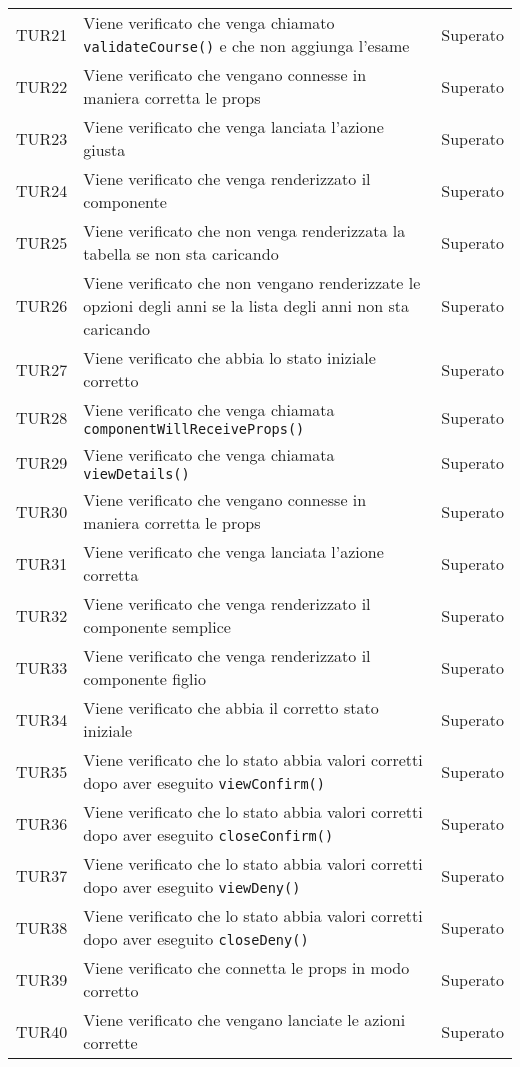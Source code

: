 \documentclass[PianoDiQualifica.tex]{subfiles}
\begin{document}
\begin{longtable}[H]{P{2cm}P{8.5cm}P{3cm}}
	TUR21 & Viene verificato che venga chiamato \texttt{validateCourse()} e che non  aggiunga l'esame & Superato \\ 
	TUR22 & Viene verificato che vengano connesse in maniera corretta le props & Superato \\ 
	TUR23 & Viene verificato che venga lanciata l'azione giusta & Superato \\ 
	TUR24 & Viene verificato che venga renderizzato il componente & Superato \\ 
	TUR25 & Viene verificato che non venga renderizzata la tabella se non sta caricando & Superato \\ 
	TUR26 & Viene verificato che non vengano renderizzate le opzioni degli anni se la lista degli anni non sta caricando & Superato \\ 
	TUR27 & Viene verificato che abbia lo stato iniziale corretto & Superato \\ 
	TUR28 & Viene verificato che venga chiamata \texttt{componentWillReceiveProps()} & Superato \\ 
	TUR29 & Viene verificato che venga chiamata \texttt{viewDetails()} & Superato \\ 
	TUR30 & Viene verificato che vengano connesse in maniera corretta le props & Superato \\ 
	TUR31 & Viene verificato che venga lanciata l'azione corretta & Superato \\ 
	TUR32 & Viene verificato che venga renderizzato il componente semplice & Superato \\ 
	TUR33 & Viene verificato che venga renderizzato il componente figlio & Superato \\ 
	TUR34 & Viene verificato che abbia il corretto stato iniziale & Superato \\ 
	TUR35 & Viene verificato che lo stato abbia valori corretti dopo aver eseguito \texttt{viewConfirm()} & Superato \\ 
	TUR36 & Viene verificato che lo stato abbia valori corretti dopo aver eseguito \texttt{closeConfirm()}  & Superato \\ 
	TUR37 & Viene verificato che lo stato abbia valori corretti dopo aver eseguito \texttt{viewDeny()} & Superato \\ 
	TUR38 & Viene verificato che lo stato abbia valori corretti dopo aver eseguito \texttt{closeDeny()} & Superato \\ 
	TUR39 & Viene verificato che connetta le props in modo corretto & Superato \\ 
	TUR40 & Viene verificato che vengano lanciate le azioni corrette & Superato \\ 

\end{longtable}
\end{document}
